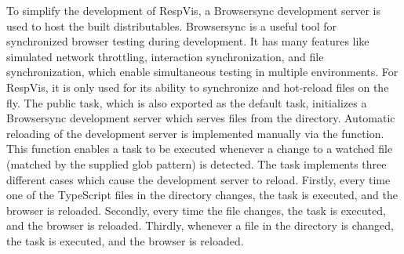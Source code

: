 To simplify the development of RespVis, a Browsersync
\parencite{Browsersync} development server is used to host the built
distributables. Browsersync is a useful tool for synchronized browser
testing during development. It has many features like simulated
network throttling, interaction synchronization, and file
synchronization, which enable simultaneous testing in multiple
environments. For RespVis, it is only used for its ability to
synchronize and hot-reload files on the fly. The public 
task, which is also exported as the default task, initializes a
Browsersync development server which serves files from the
 directory. Automatic reloading of the development server
is implemented manually via the  function. This
function enables a task to be executed whenever a change to a watched
file (matched by the supplied glob pattern) is detected. The
 task implements three different cases which cause the
development server to reload. Firstly, every time one of the
TypeScript files in the  directory changes, the
 task is executed, and the browser is
reloaded. Secondly, every time the  file
changes, the  task is executed, and the browser is
reloaded. Thirdly, whenever a file in the 
directory is changed, the  task is executed, and
the browser is reloaded.


